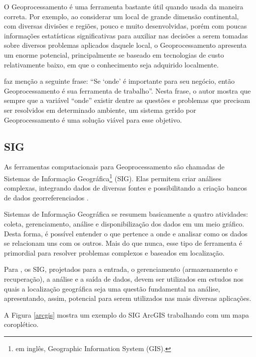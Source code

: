 \documentclass[12pt]{article}
\begin{document}
O Geoprocessamento é uma ferramenta bastante útil quando usada da maneira correta. Por exemplo, ao considerar um local de grande dimensão continental, com diversas divisões e regiões, pouco e muito desenvolvidas, porém com poucas informações estatísticas significativas para auxiliar nas decisões a serem tomadas sobre diversos problemas aplicados daquele local, o Geoprocessamento apresenta um enorme potencial, principalmente se baseado em tecnologias de custo relativamente baixo, em que o conhecimento seja adquirido localmente.

\citet{introci} faz menção a seguinte frase: “Se `onde' é importante para seu negócio, então Geoprocessamento é sua ferramenta de trabalho”. Nesta frase, o autor mostra que sempre que a variável ``onde'' existir dentre as questões e problemas que precisam ser resolvidos em determinado ambiente, um sistema gerido por Geoprocessamento é uma solução viável para esse objetivo.

\subsection{SIG}

As ferramentas computacionais para Geoprocessamento são chamadas de Sistemas de Informação Geográfica\footnote{em inglês, Geographic Information System (GIS).} (SIG). Elas permitem criar análises complexas, integrando dados de diversas fontes e possibilitando a criação bancos de dados georreferenciados \citep{sig}. 

Sistemas de Informação Geográfica se resumem basicamente a quatro atividades: coleta, gerenciamento, análise e disponibilização dos dados em um meio gráfico. Desta forma, é possível entender o que pertence a onde e analisar como os dados se relacionam uns com os outros. Mais do que nunca, esse tipo de ferramenta é primordial para resolver problemas complexos e baseados em localização.

Para \citet{geois}, os SIG, projetados para a entrada, o gerenciamento (armazenamento e recuperação), a análise e a saída de dados, devem ser utilizados em estudos nos quais a localização geográfica seja uma questão fundamental na análise, apresentando, assim, potencial para serem utilizados nas mais diversas aplicações.

A Figura \ref{arcgis} mostra um exemplo do SIG ArcGIS trabalhando com um mapa coroplético.%
\end{document}
